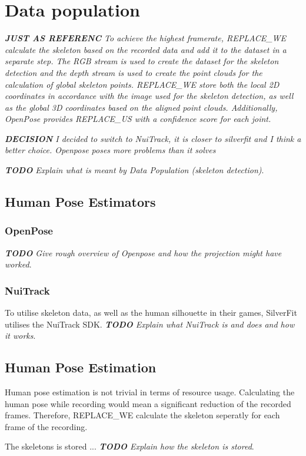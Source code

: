 \section{Data population}
\label{sec:data_population}

\textit{\textbf{JUST AS REFERENC} To achieve the highest framerate, REPLACE_WE calculate the skeleton based on the recorded data and add it to the dataset in a separate step. The RGB stream is used to create the dataset for the skeleton detection and the depth stream is used to create the point clouds for the calculation of global skeleton points. REPLACE_WE store both the local 2D coordinates in accordance with the image used for the skeleton detection, as well as the global 3D coordinates based on the aligned point clouds. Additionally, OpenPose provides REPLACE_US with a confidence score for each joint.}

\textit{\textbf{DECISION} I decided to switch to NuiTrack, it is closer to silverfit and I think a better choice. Openpose poses more problems than it solves}

\textit{\textbf{TODO} Explain what is meant by Data Population (skeleton detection)}.

\subsection{Human Pose Estimators}

\subsubsection{OpenPose}

\textit{\textbf{TODO} Give rough overview of Openpose and how the projection might have worked}.

\subsubsection{NuiTrack}

To utilise skeleton data, as well as the human silhouette in their games, SilverFit utilises the NuiTrack SDK.  \textit{\textbf{TODO} Explain what NuiTrack is and does and how it works}.

\subsection{Human Pose Estimation}

Human pose estimation is not trivial in terms of resource usage. Calculating the human pose while recording would mean a significant reduction of the recorded frames. Therefore, REPLACE_WE calculate the skeleton seperatly for each frame of the recording.

The skeletons is stored ... \textit{\textbf{TODO} Explain how the skeleton is stored}.